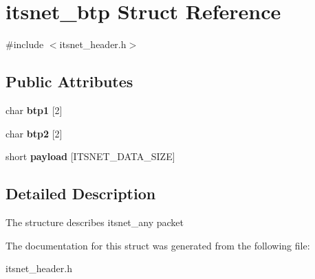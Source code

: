 \hypertarget{structitsnet__btp}{\section{itsnet\-\_\-btp \-Struct \-Reference}
\label{structitsnet__btp}
}


{\ttfamily \#include $<$itsnet\-\_\-header.\-h$>$}

\subsection*{\-Public \-Attributes}
\begin{DoxyCompactItemize}
\item 
\hypertarget{structitsnet__btp_a4639e7070ae868c620234b1ff2672357}{char {\bfseries btp1} \mbox{[}2\mbox{]}}\label{structitsnet__btp_a4639e7070ae868c620234b1ff2672357}

\item 
\hypertarget{structitsnet__btp_af24d7206f416eef23a98e9cacf46344e}{char {\bfseries btp2} \mbox{[}2\mbox{]}}\label{structitsnet__btp_af24d7206f416eef23a98e9cacf46344e}

\item 
\hypertarget{structitsnet__btp_ac469528845d4064cbc6f32c2be422191}{short {\bfseries payload} \mbox{[}\-I\-T\-S\-N\-E\-T\-\_\-\-D\-A\-T\-A\-\_\-\-S\-I\-Z\-E\mbox{]}}\label{structitsnet__btp_ac469528845d4064cbc6f32c2be422191}

\end{DoxyCompactItemize}


\subsection{\-Detailed \-Description}
\-The structure describes itsnet\-\_\-any packet 

\-The documentation for this struct was generated from the following file\-:\begin{DoxyCompactItemize}
\item 
itsnet\-\_\-header.\-h\end{DoxyCompactItemize}
